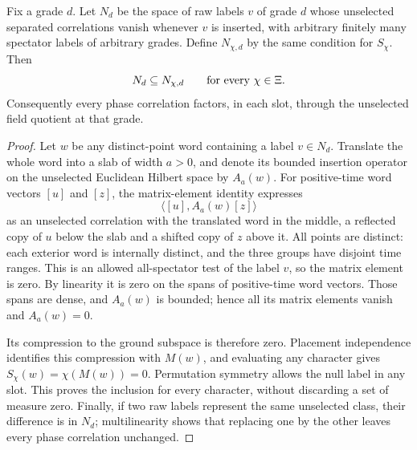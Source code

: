 \begin{lemma}
\label{ex-phase-original-null}
Fix a grade $d$. Let $N_d$ be the space of raw labels $v$ of grade $d$
whose unselected separated correlations vanish whenever $v$ is inserted,
with arbitrary finitely many spectator labels of arbitrary grades.
Define $N_{\chi,d}$ by the same condition for $S_\chi$. Then
\[
                         N_d\subseteq N_{\chi,d}
                         \qquad\hbox{for every }\chi\in\Xi.
\]
Consequently every phase correlation factors, in each slot, through the
unselected field quotient at that grade.
\end{lemma}
\begin{proof}
Let $w$ be any distinct-point word containing a label $v\in N_d$.
Translate the whole word into a slab of width $a>0$, and denote its
bounded insertion operator on the unselected Euclidean Hilbert space
by $A_a(w)$. For positive-time word vectors $[u]$ and $[z]$, the
matrix-element identity expresses
\[
                  \langle[u],A_a(w)[z]\rangle
\]
as an unselected correlation with the translated word in the middle,
a reflected copy of $u$ below the slab and a shifted copy of $z$
above it. All points are distinct: each exterior word is internally
distinct, and the three groups have disjoint time ranges. This is an
allowed all-spectator test of the label $v$, so the matrix element is
zero. By linearity it is zero on the spans of positive-time word
vectors. Those spans are dense, and $A_a(w)$ is bounded; hence all
its matrix elements vanish and $A_a(w)=0$.

Its compression to the ground subspace is therefore zero. Placement
independence identifies this compression with $M(w)$, and evaluating
any character gives $S_\chi(w)=\chi(M(w))=0$. Permutation symmetry
allows the null label in any slot. This proves the inclusion for every
character, without discarding a set of measure zero. Finally, if two
raw labels represent the same unselected class, their difference is
in $N_d$; multilinearity shows that replacing one by the other leaves
every phase correlation unchanged.
\end{proof}

